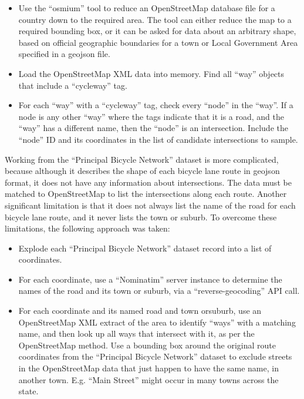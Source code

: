 \documentclass[11pt,twoside]{report}
\begin{document}
\begin{itemize}
\item{Use the ``osmium'' tool to reduce an OpenStreetMap database file for a country down to the required area.  The tool can either reduce the map to a required bounding box, or it can be asked for data about an arbitrary shape, based on official geographic boundaries for a town or Local Government Area specified in a geojson file.}
\item{Load the OpenStreetMap XML data into memory.  Find all ``way'' objects that include a ``cycleway'' tag.}
\item{For each ``way'' with a ``cycleway'' tag, check every ``node'' in the ``way''.  If a node is any other ``way'' where the tags indicate that it is a road, and the ``way'' has a different name, then the ``node'' is an intersection.  Include the ``node'' ID and its coordinates in the list of candidate intersections to sample.}
\end{itemize}

Working from the ``Principal Bicycle Network'' dataset is more complicated, because although it describes the shape of each bicycle lane route in geojson format, it does not have any information about intersections.  The data must be matched to OpenStreetMap to list the intersections along each route.  Another significant limitation is that it does not always list the name of the road for each bicycle lane route, and it never lists the town or suburb.  To overcome these limitations, the following approach was taken:

\begin{itemize}
\item{Explode each ``Principal Bicycle Network'' dataset record into a list of coordinates.}
\item{For each coordinate, use a ``Nominatim'' server instance to determine the names of the road and its town or suburb, via a ``reverse-geocoding'' API call.}
\item{For each coordinate and its named road and town orsuburb, use an OpenStreetMap XML extract of the area to identify ``ways'' with a matching name, and then look up all ways that intersect with it, as per the OpenStreetMap method.  Use a bounding box around the original route coordinates from the ``Principal Bicycle Network'' dataset to exclude streets in the OpenStreetMap data that just happen to have the same name, in another town.  E.g. ``Main Street'' might occur in many towns across the state.}
\end{itemize}
\end{document}
